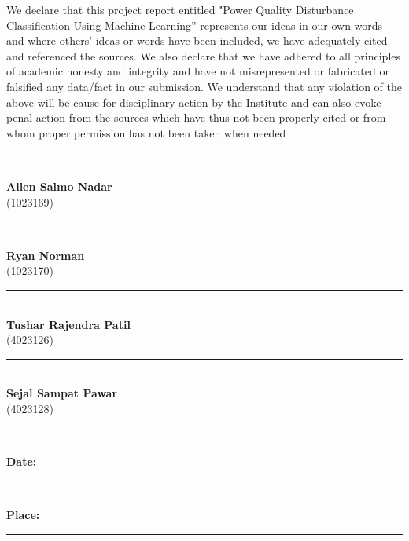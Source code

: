 \documentclass[12pt]{article}
\begin{document}
\begin{center}
\raggedright
\justifying
We declare that this project report entitled "Power Quality Disturbance Classification Using Machine Learning” represents our ideas in our own words and where others' ideas or words have been
 included, we have adequately cited and referenced the sources. We also declare that we have
 adhered to all principles of academic honesty and integrity and have not misrepresented or
 fabricated or falsified any data/fact in our submission. We understand that any violation of the
 above will be cause for disciplinary action by the Institute and can also evoke penal action
 from the sources which have thus not been properly cited or from whom proper permission
 has not been taken when needed\\[4cm]

\vspace{0cm}

\noindent
\begin{minipage}[t]{0.45\textwidth}
\centering
\rule{6cm}{0.4pt} \\[0.2cm]
\textbf{Allen Salmo Nadar} \\[0.2cm]
(1023169)
\end{minipage}
\hfill
\begin{minipage}[t]{0.45\textwidth}
\centering
\rule{6cm}{0.4pt} \\[0.2cm]
\textbf{Ryan Norman} \\[0.2cm]
(1023170)
\end{minipage}

\vspace{3cm}

\noindent
\begin{minipage}[t]{0.45\textwidth}
\centering
\rule{6cm}{0.4pt} \\[0.2cm]
\textbf{Tushar Rajendra Patil} \\[0.2cm]
(4023126)
\end{minipage}
\hfill
\begin{minipage}[t]{0.45\textwidth}
\centering
\rule{6cm}{0.4pt} \\[0.2cm]
\textbf{Sejal Sampat Pawar } \\[0.2cm]
(4023128)
\end{minipage}
\vspace{1cm}\\
\raggedright
\textbf{Date:}\rule{5cm}{0.4pt}\\\vspace{0.5cm}
\textbf{Place:}\rule{5cm}{0.4pt}

\clearpage


\end{center}
\end{document}

